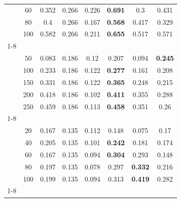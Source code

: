 \documentclass[12pt,PhD,twoside]{muthesis}
\begin{document}
\begin{tabularx}{\textwidth}{|*{8}{c|}}
	& 60 & 0.352 & 0.266 & 0.226 & \textbf{0.691} & 0.3 & 0.431 \\ 
	& 80 & 0.4 & 0.266 & 0.167 & \textbf{0.568} & 0.417 & 0.329 \\ 
	& 100 & 0.582 & 0.266 & 0.211 & \textbf{0.655} & 0.517 & 0.571 \\ \cline{1-8}
	\multirow{5}{*}{\begin{tabular}[c]{@{}c@{}} \text{vehi}\\\text{cle} \end{tabular}} & 50 & 0.083 & 0.186 & 0.12 & 0.207 & 0.094 & \textbf{0.245} \\ 
	& 100 & 0.233 & 0.186 & 0.122 & \textbf{0.277} & 0.161 & 0.208 \\ 
	& 150 & 0.331 & 0.186 & 0.122 & \textbf{0.365} & 0.248 & 0.215 \\ 
	& 200 & 0.418 & 0.186 & 0.102 & \textbf{0.411} & 0.355 & 0.288 \\ 
	& 250 & 0.459 & 0.186 & 0.113 & \textbf{0.458} & 0.351 & 0.26 \\ \cline{1-8}
	\multirow{5}{*}{\begin{tabular}[c]{@{}c@{}} \text{iono}\\\text{sphere} \end{tabular}} & 20 & 0.167 & 0.135 & 0.112 & 0.148 & 0.075 & 0.17 \\ 
	& 40 & 0.205 & 0.135 & 0.101 & \textbf{0.242} & 0.181 & 0.174 \\ 
	& 60 & 0.167 & 0.135 & 0.094 & \textbf{0.304} & 0.293 & 0.148 \\ 
	& 80 & 0.197 & 0.135 & 0.078 & 0.297 & \textbf{0.332} & 0.216 \\ 
	& 100 & 0.199 & 0.135 & 0.094 & 0.313 & \textbf{0.419} & 0.282 \\ \cline{1-8}
\end{tabularx}
\end{document}
